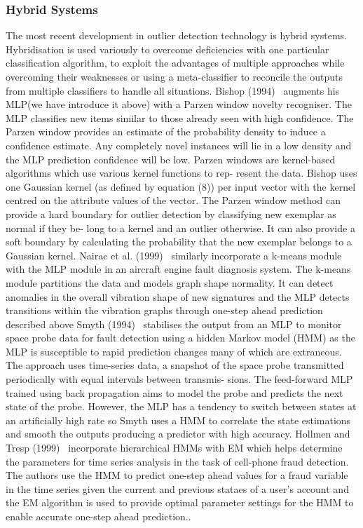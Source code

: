 \subsubsection{Hybrid Systems} 
The most recent development in outlier detection technology is hybrid systems. Hybridisation is used variously to overcome deficiencies with one particular classification algorithm, to exploit the advantages of multiple approaches while overcoming their weaknesses or using a meta-classifier to reconcile the outputs from multiple classifiers to handle all situations.
Bishop (1994) ~\cite{ref_h1}augments his MLP(we have introduce it above) with a Parzen window novelty recogniser. The MLP classifies new items similar to those already seen with high confidence. The Parzen window provides an estimate of the probability density to induce a confidence estimate. Any completely novel instances will lie in a low density and the MLP prediction confidence will be low. Parzen windows are kernel-based algorithms which use various kernel functions to rep- resent the data. Bishop uses one Gaussian kernel (as defined by equation (8)) per input vector with the kernel centred on the attribute values of the vector. The Parzen window method can provide a hard boundary for outlier detection by classifying new exemplar as normal if they be- long to a kernel and an outlier otherwise. It can also provide a soft boundary by calculating the probability that the new exemplar belongs to a Gaussian kernel. Nairac et al. (1999)~\cite{ref_i1} similarly incorporate a k-means module with the MLP module in an aircraft engine fault diagnosis system. The k-means module partitions the data and models graph shape normality. It can detect anomalies in the overall vibration shape of new signatures and the MLP detects transitions within the vibration graphs through one-step ahead prediction described above
Smyth (1994)~\cite{ref_j1}  stabilises the output from an MLP to monitor space probe data for fault detection using a hidden Markov model (HMM) as the MLP is susceptible to rapid prediction changes many of which are extraneous. The approach uses time-series data, a snapshot of the space probe transmitted periodically with equal intervals between transmis- sions. The feed-forward MLP trained using back propagation aims to model the probe and predicts the next state of the probe. However, the MLP has a tendency to switch between states at an artificially high rate so Smyth uses a HMM to correlate the state estimations and smooth the outputs producing a predictor with high accuracy. Hollmen and Tresp (1999)~\cite{ref_k1} incorporate hierarchical HMMs with EM which helps determine the parameters for time series analysis in the task of cell-phone fraud detection. The authors use the HMM to predict one-step ahead values for a fraud variable in the time series given the current and previous stataes of a user’s account and the EM algorithm is used to provide optimal parameter settings for the HMM to enable accurate one-step ahead prediction..
